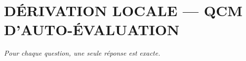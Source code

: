 
\section*{\textcolor{chapcolor}{\MakeUppercase{Dérivation locale — QCM d'auto-évaluation}}}

\begin{center}
\textit{Pour chaque question, une seule réponse est exacte.}
\end{center}

